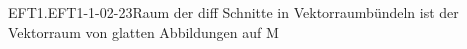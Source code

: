 \begin{REM}{EFT1.EFT1-1-02-23}{Raum der diff Schnitte in Vektorraumbündeln ist der Vektorraum von glatten Abbildungen auf M}

\end{REM}
